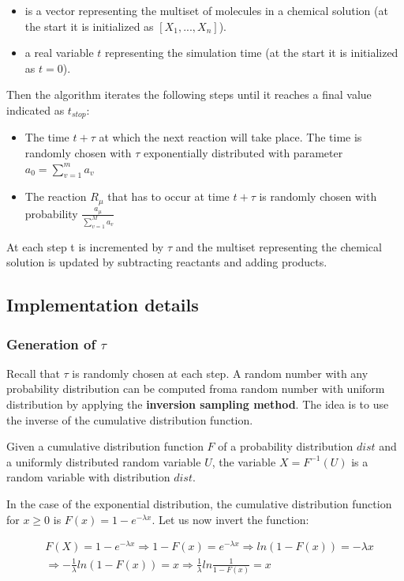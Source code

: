 \begin{itemize}
    \item is a vector representing the multiset of molecules in a chemical solution (at the start it is initialized as $[X_{1}, ..., X_{n}]$).
    \item a real variable $t$ representing the simulation time (at the start it is initialized as $t = 0$).
\end{itemize}

Then the algorithm iterates the following steps until it reaches a final value indicated as $t_{stop}$:
\begin{itemize}
    \item  The time $t + \tau$ at which the next reaction will take place. The time is randomly chosen with $\tau$ exponentially distributed with parameter $a_{0} = \sum^{m}_{v=1} a_{v}$
    \item The reaction $R_\mu$ that has to occur at time $t + \tau$ is randomly chosen with probability $\frac{a_{\mu}}{\sum^{M}_{v=1} a_{v}}$
\end{itemize}

At each step t is incremented by $\tau$ and the multiset representing the chemical solution is updated by subtracting reactants and adding products.

\subsection{Implementation details}

\subsubsection{Generation of $\tau$}
Recall that $\tau$ is randomly chosen at each step. A random number with any probability distribution can be computed froma  random number with uniform distribution by applying the \textbf{inversion sampling method}. The idea is to use the inverse of the cumulative distribution function.

Given a cumulative distribution function $F$ of a probability distribution $dist$ and a uniformly  distributed random variable $U$, the variable $X = F^{-1}(U)$ is a random variable with distribution $dist$.\par

In the case of the exponential distribution, the cumulative distribution function for $x \geq 0$ is $F(x) = 1 - e^{- \lambda x}$. Let us now invert the function:

\begin{align*}
    &F(X) = 1 - e^{- \lambda x} \Rightarrow 1 - F(x) = e^{- \lambda x}
    \Rightarrow ln(1 - F(x)) = - \lambda x \\ &\Rightarrow - \frac{1}{\lambda} ln(1 - F(x)) = x \Rightarrow \frac{1}{\lambda} ln \frac{1}{1 - F(x)} = x
\end{align*}

